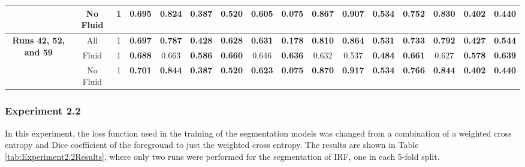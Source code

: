 \begin{table}[!ht]
{\begin{tabular}{|c|c|c|ccc|ccc|ccc|c|c|c|c|}
			& No Fluid & 1 & \multicolumn{1}{c|}{0.695} & \multicolumn{1}{c|}{0.824} & \textbf{0.387} & \multicolumn{1}{c|}{\textbf{0.520}} & \multicolumn{1}{c|}{0.605} & \textbf{0.075} & \multicolumn{1}{c|}{0.867} & \multicolumn{1}{c|}{0.907} & \textbf{0.534} & 0.752 & 0.830 & \textbf{0.402} & \textbf{0.440} \\
			
			\hline
			\hline
			
			\multirow{3}{*}{\parbox{2cm}{\textbf{Runs 42, 52, and 59}}} & All & 1 & \multicolumn{1}{c|}{\textbf{0.697}} & \multicolumn{1}{c|}{\textbf{0.787}} & \textbf{0.428} & \multicolumn{1}{c|}{\textbf{0.628}} & \multicolumn{1}{c|}{\textbf{0.631}} & \textbf{0.178} & \multicolumn{1}{c|}{\textbf{0.810}} & \multicolumn{1}{c|}{\textbf{0.864}} & \textbf{0.531} & \textbf{0.733} & \textbf{0.792} & \textbf{0.427} & \textbf{0.544} \\
			
			& Fluid & 1 & \multicolumn{1}{c|}{\textbf{0.688}} & \multicolumn{1}{c|}{0.663} & \textbf{0.586} & \multicolumn{1}{c|}{\textbf{0.660}} & \multicolumn{1}{c|}{0.646} & \textbf{0.636} & \multicolumn{1}{c|}{0.632} & \multicolumn{1}{c|}{0.537} & \textbf{0.484} & \textbf{0.661} & 0.627 & \textbf{0.578} & \textbf{0.639} \\
			
			& No Fluid & 1 & \multicolumn{1}{c|}{\textbf{0.701}} & \multicolumn{1}{c|}{\textbf{0.844}} & \textbf{0.387} & \multicolumn{1}{c|}{\textbf{0.520}} & \multicolumn{1}{c|}{\textbf{0.623}} & \textbf{0.075} & \multicolumn{1}{c|}{\textbf{0.870}} & \multicolumn{1}{c|}{\textbf{0.917}} & \textbf{0.534} & \textbf{0.766} & \textbf{0.844} & \textbf{0.402} & \textbf{0.440} \\
			
			\hline
			
	\end{tabular}}
	\label{tab:Experiment2FinalResults}
\end{table}

\subsubsection{Experiment 2.2}

In this experiment, the loss function used in the training of the segmentation models was changed from a combination of a weighted cross entropy and Dice coefficient of the foreground to just the weighted cross entropy. The results are shown in Table \ref{tab:Experiment2.2Results}, where only two runs were performed for the segmentation of IRF, one in each 5-fold split. 

